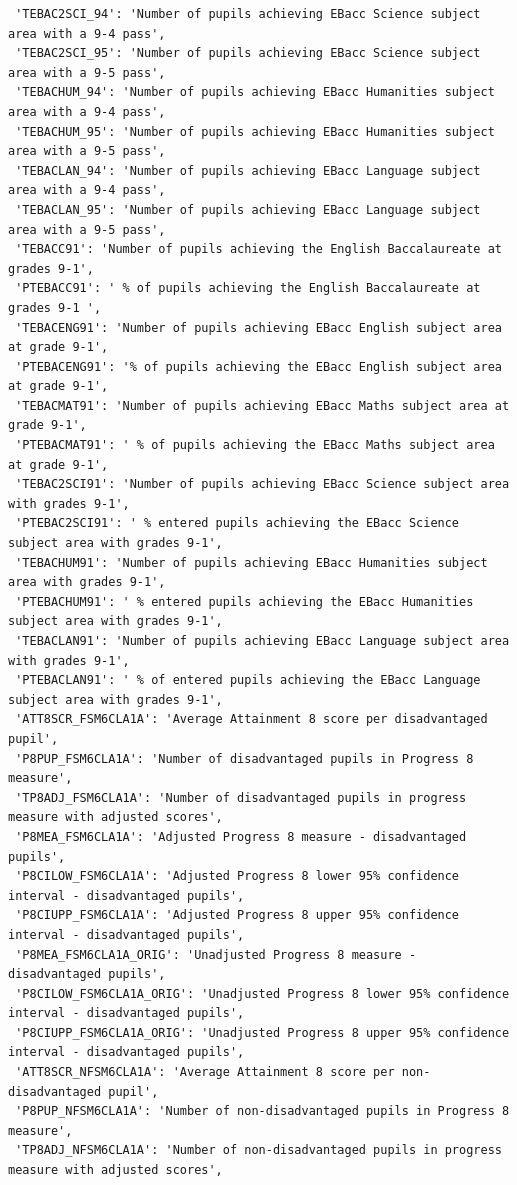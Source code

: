 \documentclass[
  letterpaper,
  DIV=11,
  numbers=noendperiod]{scrartcl}
\begin{document}
\begin{verbatim}
 'TEBAC2SCI_94': 'Number of pupils achieving EBacc Science subject area with a 9-4 pass',
 'TEBAC2SCI_95': 'Number of pupils achieving EBacc Science subject area with a 9-5 pass',
 'TEBACHUM_94': 'Number of pupils achieving EBacc Humanities subject area with a 9-4 pass',
 'TEBACHUM_95': 'Number of pupils achieving EBacc Humanities subject area with a 9-5 pass',
 'TEBACLAN_94': 'Number of pupils achieving EBacc Language subject area with a 9-4 pass',
 'TEBACLAN_95': 'Number of pupils achieving EBacc Language subject area with a 9-5 pass',
 'TEBACC91': 'Number of pupils achieving the English Baccalaureate at grades 9-1',
 'PTEBACC91': ' % of pupils achieving the English Baccalaureate at grades 9-1 ',
 'TEBACENG91': 'Number of pupils achieving EBacc English subject area at grade 9-1',
 'PTEBACENG91': '% of pupils achieving the EBacc English subject area at grade 9-1',
 'TEBACMAT91': 'Number of pupils achieving EBacc Maths subject area at grade 9-1',
 'PTEBACMAT91': ' % of pupils achieving the EBacc Maths subject area at grade 9-1',
 'TEBAC2SCI91': 'Number of pupils achieving EBacc Science subject area with grades 9-1',
 'PTEBAC2SCI91': ' % entered pupils achieving the EBacc Science subject area with grades 9-1',
 'TEBACHUM91': 'Number of pupils achieving EBacc Humanities subject area with grades 9-1',
 'PTEBACHUM91': ' % entered pupils achieving the EBacc Humanities subject area with grades 9-1',
 'TEBACLAN91': 'Number of pupils achieving EBacc Language subject area with grades 9-1',
 'PTEBACLAN91': ' % of entered pupils achieving the EBacc Language subject area with grades 9-1',
 'ATT8SCR_FSM6CLA1A': 'Average Attainment 8 score per disadvantaged pupil',
 'P8PUP_FSM6CLA1A': 'Number of disadvantaged pupils in Progress 8 measure',
 'TP8ADJ_FSM6CLA1A': 'Number of disadvantaged pupils in progress measure with adjusted scores',
 'P8MEA_FSM6CLA1A': 'Adjusted Progress 8 measure - disadvantaged pupils',
 'P8CILOW_FSM6CLA1A': 'Adjusted Progress 8 lower 95% confidence interval - disadvantaged pupils',
 'P8CIUPP_FSM6CLA1A': 'Adjusted Progress 8 upper 95% confidence interval - disadvantaged pupils',
 'P8MEA_FSM6CLA1A_ORIG': 'Unadjusted Progress 8 measure - disadvantaged pupils',
 'P8CILOW_FSM6CLA1A_ORIG': 'Unadjusted Progress 8 lower 95% confidence interval - disadvantaged pupils',
 'P8CIUPP_FSM6CLA1A_ORIG': 'Unadjusted Progress 8 upper 95% confidence interval - disadvantaged pupils',
 'ATT8SCR_NFSM6CLA1A': 'Average Attainment 8 score per non-disadvantaged pupil',
 'P8PUP_NFSM6CLA1A': 'Number of non-disadvantaged pupils in Progress 8 measure',
 'TP8ADJ_NFSM6CLA1A': 'Number of non-disadvantaged pupils in progress measure with adjusted scores',

\end{verbatim}
\end{document}

